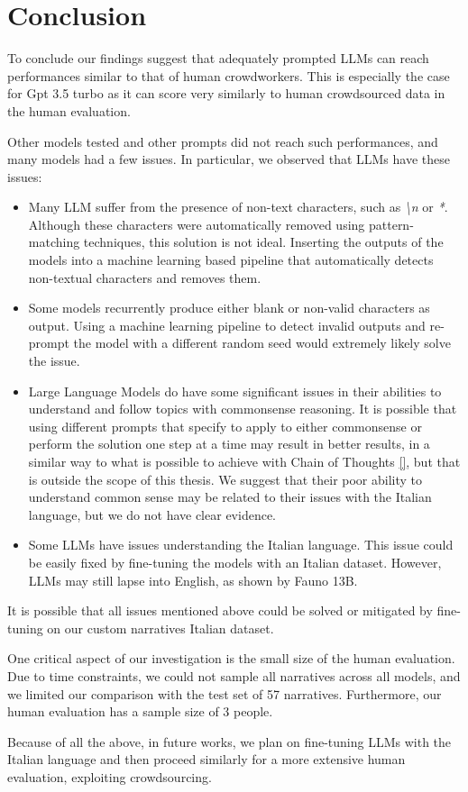 \chapter{Conclusion}
\label{cha:conclusion}
To conclude our findings suggest that adequately prompted LLMs can reach performances similar to that of human crowdworkers. This is especially the case for Gpt 3.5 turbo as it can score very similarly to human crowdsourced data in the human evaluation.

Other models tested and other prompts did not reach such performances, and many models had a few issues. In particular, we observed that LLMs have these issues:
\begin{itemize}
    \item Many LLM suffer from the presence of non-text characters, such as \emph{\textbackslash n} or \emph{*}. Although these characters were automatically removed using pattern-matching techniques, this solution is not ideal. Inserting the outputs of the models into a machine learning based pipeline that automatically detects non-textual characters and removes them.
    \item Some models recurrently produce either blank or non-valid characters as output. Using a machine learning pipeline to detect invalid outputs and re-prompt the model with a different random seed would extremely likely solve the issue.
    \item Large Language Models do have some significant issues in their abilities to understand and follow topics with commonsense reasoning. It is possible that using different prompts that specify to apply to either commonsense or perform the solution one step at a time may result in better results, in a similar way to what is possible to achieve with Chain of Thoughts \ref{}, but that is outside the scope of this thesis. We suggest that their poor ability to understand common sense may be related to their issues with the Italian language, but we do not have clear evidence.
    \item Some LLMs have issues understanding the Italian language. This issue could be easily fixed by fine-tuning the models with an Italian dataset. However, LLMs may still lapse into English, as shown by Fauno 13B.
\end{itemize}
It is possible that all issues mentioned above could be solved or mitigated by fine-tuning on our custom narratives Italian dataset.

One critical aspect of our investigation is the small size of the human evaluation. Due to time constraints, we could not sample all narratives across all models, and we limited our comparison with the test set of 57 narratives. Furthermore, our human evaluation has a sample size of 3 people.  

Because of all the above, in future works, we plan on fine-tuning LLMs with the Italian language and then proceed similarly for a more extensive human evaluation, exploiting crowdsourcing. 